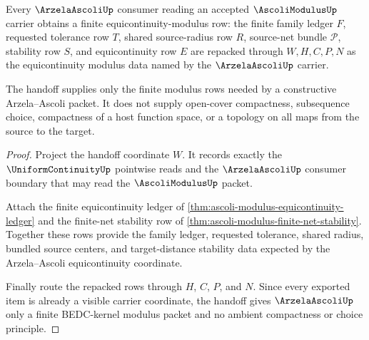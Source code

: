 \begin{theorem}
\label{thm:ascoli-modulus-arzela-ascoli-handoff}
Every $\ArzelaAscoliUp$ consumer reading an accepted $\AscoliModulusUp$ carrier obtains a finite equicontinuity-modulus row: the finite family ledger $F$, requested tolerance row $T$, shared source-radius row $R$, source-net bundle $\mathcal{P}$, stability row $S$, and equicontinuity row $E$ are repacked through $W,H,C,P,N$ as the equicontinuity modulus data named by the $\ArzelaAscoliUp$ carrier.

The handoff supplies only the finite modulus rows needed by a constructive Arzela--Ascoli packet. It does not supply open-cover compactness, subsequence choice, compactness of a host function space, or a topology on all maps from the source to the target.
\end{theorem}
\begin{proof}
Project the handoff coordinate $W$. It records exactly the $\UniformContinuityUp$ pointwise reads and the $\ArzelaAscoliUp$ consumer boundary that may read the $\AscoliModulusUp$ packet.

Attach the finite equicontinuity ledger of \autoref{thm:ascoli-modulus-equicontinuity-ledger} and the finite-net stability row of \autoref{thm:ascoli-modulus-finite-net-stability}. Together these rows provide the family ledger, requested tolerance, shared radius, bundled source centers, and target-distance stability data expected by the Arzela--Ascoli equicontinuity coordinate.

Finally route the repacked rows through $H$, $C$, $P$, and $N$. Since every exported item is already a visible carrier coordinate, the handoff gives $\ArzelaAscoliUp$ only a finite BEDC-kernel modulus packet and no ambient compactness or choice principle.
\end{proof}

